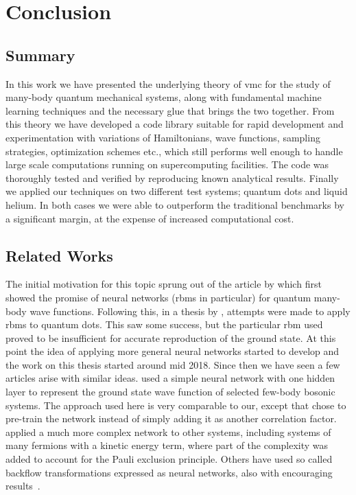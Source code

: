\documentclass[Thesis.tex]{subfiles}
\begin{document}
\chapter{Conclusion}
\label{chp:conclusion}

\section{Summary}

In this work we have presented the underlying theory of \gls{vmc}
for the study of many-body quantum mechanical systems, along
with fundamental machine learning techniques and the necessary glue that
brings the two together. From this theory we have developed a code
library suitable for rapid development and experimentation with
variations of Hamiltonians, wave functions, sampling strategies,
optimization schemes etc., which still performs well enough to
handle large scale computations running on supercomputing facilities. The
code was thoroughly tested and verified by reproducing known analytical
results. Finally we applied our techniques on two different test
systems; quantum dots and liquid helium. In both cases we were able to
outperform the traditional benchmarks by a significant margin, at the
expense of increased computational cost.


\section{Related Works}

The initial motivation for this topic sprung out of the article by
\textcite{Carleo602} which first showed the promise of neural networks
(\glspl{rbm} in particular) for quantum many-body wave functions. Following
this, in a thesis by \textcite{Flugsrud-2018}, attempts were made to apply
\glspl{rbm} to quantum dots. This saw some success, but the particular \gls{rbm}
used proved to be insufficient for accurate reproduction of the ground state. At
this point the idea of applying more general neural networks started to develop
and the work on this thesis started around mid 2018. Since then we have seen a
few articles arise with similar ideas. \textcite{Saito-2018} used a simple
neural network with one hidden layer to represent the ground state wave function
of selected few-body bosonic systems. The approach used here is very comparable
to our, except that \citeauthor{Saito-2018} chose to pre-train the network
instead of simply adding it as another correlation factor. \textcite{Han-2018}
applied a much more complex network to other systems, including systems of many
fermions with a kinetic energy term, where part of the complexity was added to
account for the Pauli exclusion principle. Others have used so called backflow
transformations expressed as neural networks, also with encouraging
results~\cite{ruggeri2018,Luo-2019}.
\end{document}
